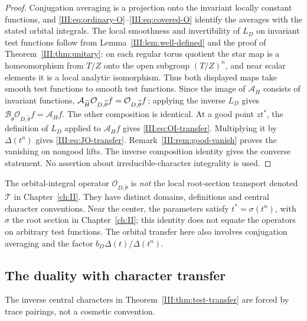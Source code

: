 \begin{proof}
Conjugation averaging is a projection onto the invariant locally constant
functions, and \eqref{III:eq:ordinary-O}--\eqref{III:eq:covered-O} identify the
averages with the stated orbital integrals. The local smoothness and
invertibility of $L_D$ on invariant test functions follow from
Lemma~\ref{III:lem:well-defined} and the proof of
Theorem~\ref{III:thm:unitary}: on each regular torus quotient the star map is
a homeomorphism from $T/Z$ onto the open subgroup $(T/Z)^n$, and near
scalar elements it is a local analytic isomorphism. Thus both displayed
maps take smooth test functions to smooth test functions.
Since the image of $\mathcal A_H$ consists of invariant functions,
$\mathcal A_{\widetilde H}\mathcal O_{D,\widetilde\theta}f
=\mathcal O_{D,\widetilde\theta}f$; applying the inverse $L_D$
gives $\mathcal B_{\widetilde\theta}\mathcal O_{D,\widetilde\theta}f
=\mathcal A_Hf$. The other composition is identical.
At a good point $z t^*$, the definition of $L_D$ applied to
$\mathcal A_Hf$ gives \eqref{III:eq:OI-transfer}. Multiplying it by
$\Delta(t^n)$ gives \eqref{III:eq:JO-transfer}. Remark~\ref{III:rem:good-vanish}
proves the vanishing on nongood lifts. The inverse composition identity
gives the converse statement. No assertion about irreducible-character
integrality is used.
\end{proof}

\begin{remark}\label{III:rem:root-comparison}
The orbital-integral operator $\mathcal O_{D,\widetilde\theta}$ is
\emph{not} the local root-section transport denoted $\mathcal T$
in Chapter~\ref{ch:II}. They have distinct domains, definitions and central
character conventions.  Near the center, the parameters satisfy
$t^*=\sigma(t^n)$, with $\sigma$ the root section in Chapter~\ref{ch:II};
this identity does not equate the operators on arbitrary test
functions. The orbital transfer here also involves conjugation
averaging and the factor $b_D\Delta(t)/\Delta(t^n)$.
\end{remark}

\subsection{The duality with character transfer}
The inverse central characters in Theorem~\ref{III:thm:test-transfer} are
forced by trace pairings, not a cosmetic convention.

